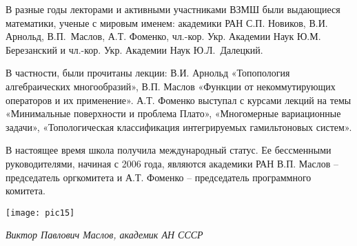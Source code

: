 В разные годы лекторами и активными участниками ВЗМШ были выдающиеся математики, ученые с мировым именем: академики РАН С.П. Новиков, В.И. Арнольд, В.П.~Маслов, А.Т. Фоменко, чл.-кор. Укр. Академии Наук Ю.М. Березанский и чл.-кор. Укр. Академии Наук Ю.Л.~Далецкий.

В частности, были прочитаны лекции: В.И. Арнольд «Топопология алгебраических многообразий», В.П. Маслов «Функции от некоммутирующих операторов и их применение». А.Т. Фоменко выступал с курсами лекций на темы «Минимальные поверхности и проблема Плато», «Многомерные вариационные задачи», «Топологическая классификация интегрируемых гамильтоновых систем».

В настоящее время школа получила международный статус.  Ее бессменными руководителями, начиная с 2006 года, являются академики РАН В.П. Маслов – председатель оргкомитета и А.Т. Фоменко – председатель программного комитета.

\begin{center}

\texttt{[image: pic15]}


{\it Виктор Павлович Маслов, академик АН СССР}
\end{center}


